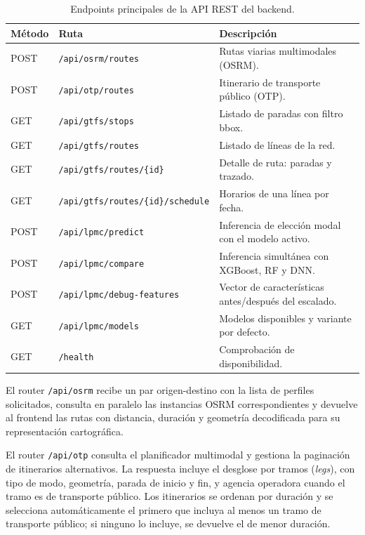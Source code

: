 \begin{table}[htbp]
  \caption{Endpoints principales de la API REST del backend.}
  \label{tab:endpoints_api}
  \centering
  \begin{tabular}{llp{6.5cm}}
    \hline
    \textbf{Método} & \textbf{Ruta} & \textbf{Descripción} \\
    \hline
    POST & \texttt{/api/osrm/routes}                  & Rutas viarias multimodales (OSRM). \\
    POST & \texttt{/api/otp/routes}                   & Itinerario de transporte público (OTP). \\
    GET  & \texttt{/api/gtfs/stops}                   & Listado de paradas con filtro bbox. \\
    GET  & \texttt{/api/gtfs/routes}                  & Listado de líneas de la red. \\
    GET  & \texttt{/api/gtfs/routes/\{id\}}           & Detalle de ruta: paradas y trazado. \\
    GET  & \texttt{/api/gtfs/routes/\{id\}/schedule}  & Horarios de una línea por fecha. \\
    POST & \texttt{/api/lpmc/predict}                 & Inferencia de elección modal con el modelo activo. \\
    POST & \texttt{/api/lpmc/compare}                 & Inferencia simultánea con XGBoost, RF y DNN. \\
    POST & \texttt{/api/lpmc/debug-features}          & Vector de características antes/después del escalado. \\
    GET  & \texttt{/api/lpmc/models}                  & Modelos disponibles y variante por defecto. \\
    GET  & \texttt{/health}                           & Comprobación de disponibilidad. \\
    \hline
  \end{tabular}
\end{table}

El router \texttt{/api/osrm} recibe un par origen-destino con la lista de perfiles solicitados, consulta en paralelo las instancias OSRM correspondientes y devuelve al frontend las rutas con distancia, duración y geometría decodificada para su representación cartográfica.

El router \texttt{/api/otp} consulta el planificador multimodal y gestiona la paginación de itinerarios alternativos. La respuesta incluye el desglose por tramos (\textit{legs}), con tipo de modo, geometría, parada de inicio y fin, y agencia operadora cuando el tramo es de transporte público. Los itinerarios se ordenan por duración y se selecciona automáticamente el primero que incluya al menos un tramo de transporte público; si ninguno lo incluye, se devuelve el de menor duración.

